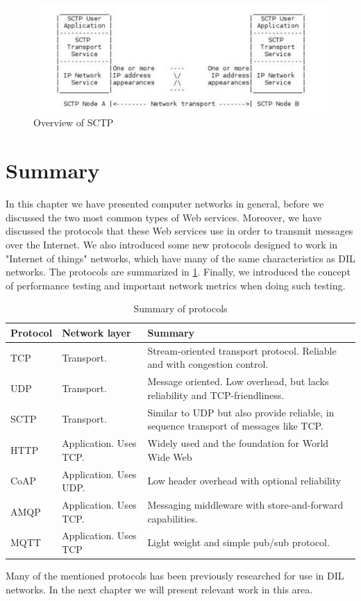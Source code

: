 \begin{figure}[h]
\includegraphics[scale=0.5]{images/sctp.pdf}
\caption{Overview of SCTP}
\end{figure}



\section{Summary}

In this chapter we have presented computer networks in general, before we
discussed the two most common types of Web services. Moreover, we have discussed
the protocols that these Web services use in order to transmit messages over the
Internet. We also introduced some new protocols designed to work in "Internet of
things" networks, which have many of the same characteristics as DIL networks.
The protocols are summarized in \cref{table:protocols:summary}. Finally, we
introduced the concept of performance testing and important network metrics when
doing such testing.

\begin{table}[h]
\begin{tabularx}{\textwidth}{| l | l | X |}
\hline
  \textbf{Protocol} & \textbf{Network layer} & \textbf{Summary} \\ \hline
  TCP & Transport. & Stream-oriented transport protocol. Reliable and with congestion control. \\ \hline
  UDP & Transport. & Message oriented. Low overhead, but lacks reliability and TCP-friendliness. \\ \hline
  SCTP & Transport. & Similar to UDP but also provide reliable, in sequence transport of messages like TCP. \\ \hline
  HTTP & Application. Uses TCP. &  Widely used and the foundation for World Wide Web\\ \hline
  CoAP & Application. Uses UDP. & Low header overhead with optional reliability \\ \hline
  AMQP & Application. Uses TCP. &  Messaging middleware with store-and-forward capabilities.\\ \hline
  MQTT & Application. Uses TCP & Light weight and simple pub/sub protocol. \\ \hline
\end{tabularx}
\caption{Summary of protocols}
\label{table:protocols:summary}
\end{table}

Many of the mentioned protocols has been previously researched for use in DIL
networks. In the next chapter we will present relevant work in this area.

